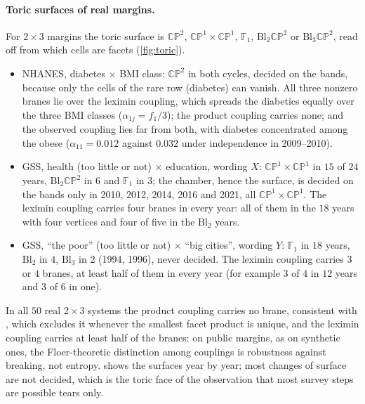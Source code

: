 \documentclass[11pt]{article}
\theoremstyle{definition}
\theoremstyle{remark}
\begin{document}
\paragraph{Toric surfaces of real margins.} For $2\times3$ margins the toric surface is $\mathbb{CP}^2$, $\mathbb{CP}^1\times\mathbb{CP}^1$,
$\mathbb F_1$, $\mathrm{Bl}_2\mathbb{CP}^2$ or $\mathrm{Bl}_3\mathbb{CP}^2$, read off from which cells are facets \cite[Prop.~8.1]{Bridges}
(\cref{fig:toric}).
\begin{itemize}[leftmargin=*,nosep]
\item NHANES, diabetes $\times$ BMI class: $\mathbb{CP}^2$ in both cycles, decided on the bands, because only the cells of the rare row
  (diabetes) can vanish. All three nonzero branes lie over the leximin coupling, which spreads the diabetics equally over the three BMI
  classes ($\alpha_{1j}=f_1/3$); the product coupling carries none; and the observed coupling lies far from both, with diabetes concentrated
  among the obese ($\alpha_{11}=0.012$ against $0.032$ under independence in 2009--2010).
\item GSS, health (too little or not) $\times$ education, wording $X$: $\mathbb{CP}^1\times\mathbb{CP}^1$ in $15$ of $24$ years,
  $\mathrm{Bl}_2\mathbb{CP}^2$ in $6$ and $\mathbb F_1$ in $3$; the chamber, hence the surface, is decided on the bands only in 2010, 2012,
  2014, 2016 and 2021, all $\mathbb{CP}^1\times\mathbb{CP}^1$. The leximin coupling carries four branes in every year: all of them in
  the $18$ years with four vertices and four of five in the $\mathrm{Bl}_2$ years.
\item GSS, ``the poor'' (too little or not) $\times$ ``big cities'', wording $Y$: $\mathbb F_1$ in $18$ years, $\mathrm{Bl}_2$ in $4$, $\mathrm{Bl}_3$
  in $2$ (1994, 1996), never decided. The leximin coupling carries $3$ or $4$ branes, at least half of them in every year (for example
  $3$ of $4$ in $12$ years and $3$ of $6$ in one).
\end{itemize}
In all $50$ real $2\times3$ systems the product coupling carries no brane, consistent with \cite[Thm.~8.2(iii)]{Bridges}, which excludes it whenever the smallest
facet product is unique, and the leximin coupling carries at least half of the branes: on public margins, as on synthetic ones, the Floer-theoretic
distinction among couplings is robustness against breaking, not entropy.  shows the surfaces year by year; most
changes of surface are not decided, which is the toric face of the observation that most survey steps are possible tears only.
\end{document}
